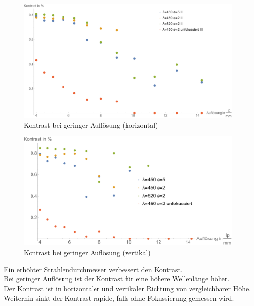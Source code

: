 \begin{minipage}{\linewidth}
\begin{figure}[H]
	\centering
\includegraphics[width=1.0\linewidth]{IMAGE/Versuch2Plot1horizontal2.pdf}
	\caption{Kontrast bei geringer Auflösung (horizontal)}
	\label{fig:Versuch2_Plot2h1}
\end{figure} 

\begin{figure}[H]
	\centering
\includegraphics[width=1.0\linewidth]{IMAGE/Versuch2Plot1vertikal2.pdf}
	\caption{Kontrast bei geringer Auflösung (vertikal)}
	\label{fig:Versuch2_Plot2v1}
\end{figure} 

Ein erhöhter Strahlendurchmesser verbessert den Kontrast.\\
Bei geringer Auflösung ist der Kontrast für eine höhere Wellenlänge höher.\\
Der Kontrast ist in horizontaler und vertikaler Richtung von vergleichbarer Höhe.\\
Weiterhin sinkt der Kontrast rapide, falls ohne Fokussierung gemessen wird.
\end{minipage}

